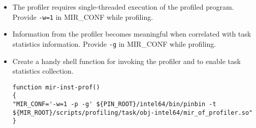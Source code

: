 \documentclass[11pt,a4paper]{article}
\begin{document}
\begin{itemize}
\item The profiler requires single-threaded execution of the profiled program. Provide \texttt{-w=1} in MIR\_CONF while profiling.

\item Information from the profiler becomes meaningful when correlated with task statistics information. Provide \texttt{-g} in MIR\_CONF while profiling.

\item Create a handy shell function for invoking the profiler and to enable task statistics collection.
  
\begin{lstlisting}[style=MyInputStyle]
function mir-inst-prof()
{
"MIR_CONF='-w=1 -p -g' ${PIN_ROOT}/intel64/bin/pinbin -t ${MIR_ROOT}/scripts/profiling/task/obj-intel64/mir_of_profiler.so"
}
\end{lstlisting}
\end{itemize}
\end{document}
